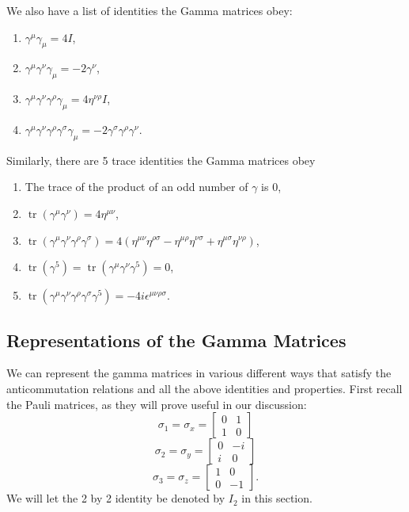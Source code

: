We also have a list of identities the Gamma matrices obey:
\begin{enumerate}
\item $\displaystyle\gamma^\mu\gamma_\mu = 4I$,
\item $\displaystyle\gamma^\mu\gamma^\nu\gamma_\mu=-2\gamma^\nu$,
\item $\displaystyle\gamma^\mu\gamma^\nu\gamma^\rho\gamma_\mu=4\eta^{\nu\rho} I$,
\item $\displaystyle\gamma^\mu\gamma^\nu\gamma^\rho\gamma^\sigma\gamma_\mu=-2\gamma^\sigma\gamma^\rho\gamma^\nu$.
\end{enumerate}
Similarly, there are 5 trace identities the Gamma matrices obey
\begin{enumerate}
\item The trace of the product of an odd number of $\gamma$ is 0,
\item $\operatorname{tr} (\gamma^\mu\gamma^\nu) = 4\eta^{\mu\nu}$,
\item $\operatorname{tr}(\gamma^\mu\gamma^\nu\gamma^\rho\gamma^\sigma)=4(\eta^{\mu\nu}\eta^{\rho\sigma}-\eta^{\mu\rho}\eta^{\nu\sigma}+\eta^{\mu\sigma}\eta^{\nu\rho})$,
\item $\operatorname{tr}(\gamma^5)=\operatorname{tr} (\gamma^\mu\gamma^\nu\gamma^5) = 0$,
\item $\operatorname{tr} (\gamma^\mu\gamma^\nu\gamma^\rho\gamma^\sigma\gamma^5) = -4i\epsilon^{\mu\nu\rho\sigma}$.
\end{enumerate}


\subsection{Representations of the Gamma Matrices}\label{Representations of the Gamma Matrices}

We can represent the gamma matrices in various different ways that satisfy the anticommutation relations and all the above identities and properties. First recall the Pauli matrices, as they will prove useful in our discussion:
\begin{equation}
\sigma_1 = \sigma_x = \begin{bmatrix} 0&1\\ 1&0 \end{bmatrix}
\end{equation}
\begin{equation}
\sigma_2 = \sigma_y = \begin{bmatrix} 0&-i\\ i&0 \end{bmatrix}
\end{equation}
\begin{equation}
\sigma_3 = \sigma_z = \begin{bmatrix} 1&0\\ 0&-1 \end{bmatrix}.
\end{equation}
We will let the 2 by 2 identity be denoted by $I_{2}$ in this section.

